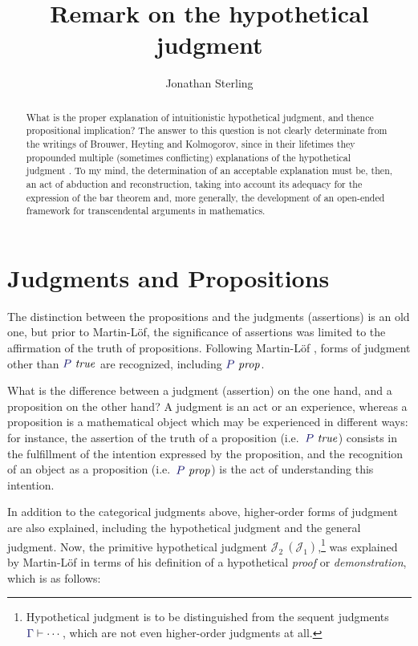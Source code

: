 \documentclass[11pt]{amsart}
\theoremstyle{definition}
\theoremstyle{remark}
\numberwithin{equation}{section}
\def\InputModeColorName{MidnightBlue}
\newcommand\InputMode[1]{{\color{\InputModeColorName}{#1}}}
\newcommand\HypJ[2]{#1\ (#2)}
\newcommand\JJ{\mathcal{J}}
\newcommand\IsTrue[1]{\InputMode{#1}\ \mathit{true}}
\newcommand\IsProp[1]{\InputMode{#1}\ \mathit{prop}}
\newcommand\Seq[2]{\InputMode{#1}\vdash #2}
\begin{document}
\title{Remark on the hypothetical judgment}

\author{Jonathan Sterling}
\address{}

\onehalfspacing

\begin{abstract}

What is the proper explanation of intuitionistic hypothetical judgment, and
thence propositional implication? The answer to this question is not clearly
determinate from the writings of Brouwer, Heyting and Kolmogorov, since in their
lifetimes they propounded multiple (sometimes conflicting) explanations of the
hypothetical judgment \cite{van-dalen:2004}. To my mind, the determination of an
acceptable explanation must be, then, an act of abduction and reconstruction,
taking into account its adequacy for the expression of the bar theorem and, more
generally, the development of an open-ended framework for transcendental
arguments in mathematics.

\end{abstract}

\maketitle

\section{Judgments and Propositions}

The distinction between the propositions and the judgments (assertions) is an
old one, but prior to Martin-L\"of, the significance of assertions was limited
to the affirmation of the truth of propositions. Following Martin-L\"of
\cite{siena.lectures}, forms of judgment other than $\IsTrue{P}$ are recognized,
including $\IsProp{P}$.

What is the difference between a judgment (assertion) on the one hand, and a
proposition on the other hand? A judgment is an act or an experience, whereas a
proposition is a mathematical object which may be experienced in different ways:
for instance, the assertion of the truth of a proposition (i.e.\ $\IsTrue{P}$)
consists in the fulfillment of the intention expressed by the proposition, and
the recognition of an object as a proposition (i.e.\ $\IsProp{P}$) is the act of
understanding this intention.

In addition to the categorical judgments above, higher-order forms of judgment
are also explained, including the hypothetical judgment and the general
judgment. Now, the primitive hypothetical judgment
$\HypJ{\JJ_2}{\JJ_1}$,\footnote{Hypothetical judgment is to be distinguished
from the sequent judgments $\Seq{\Gamma}{\cdots}$, which are not even
higher-order judgments at all.} was explained by Martin-L\"of in terms of his
definition of a hypothetical \emph{proof} or \emph{demonstration}, which is as
follows:
\end{document}
